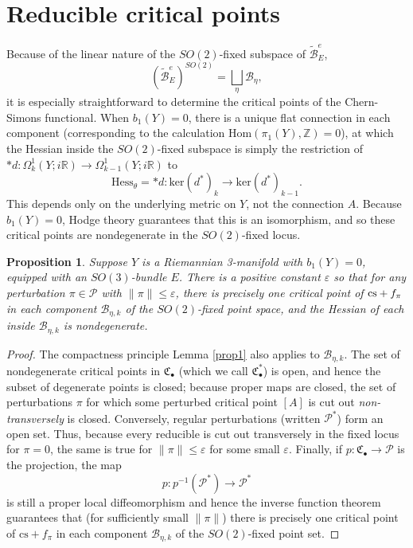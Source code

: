 \documentclass{memo-l}
\newtheorem{proposition}[theorem]{Proposition}
\theoremstyle{definition}
\theoremstyle{remark}
\numberwithin{section}{chapter}
\numberwithin{equation}{chapter}
\begin{document}
\section{Reducible critical points}\label{sec:3d-red}
Because of the linear nature of the $SO(2)$-fixed subspace of $\widetilde{\mathcal B}^e_E$, $$\left(\widetilde{\mathcal B}^e_E\right)^{SO(2)} = \bigsqcup_\eta \mathcal B_{\eta},$$ it is especially straightforward to determine the critical points of the Chern-Simons functional. When $b_1(Y) = 0$, there is a unique flat connection in each component (corresponding to the calculation $\text{Hom}(\pi_1(Y), \mathbb Z) = 0$), at which the Hessian inside the $SO(2)$-fixed subspace is simply the restriction of $*d: \Omega^1_k(Y;i\mathbb R) \to \Omega^1_{k-1}(Y;i\mathbb R)$ to $$\text{Hess}_\theta = *d: \text{ker}(d^*)_k \to \text{ker}(d^*)_{k-1}.$$ This depends only on the underlying metric on $Y$, not the connection $A$. Because $b_1(Y) = 0$, Hodge theory guarantees that this is an isomorphism, and so these critical points are nondegenerate in the $SO(2)$-fixed locus. 

\begin{proposition}\label{red1}Suppose $Y$ is a Riemannian 3-manifold with $b_1(Y) = 0$, equipped with an $SO(3)$-bundle $E$. There is a positive constant $\varepsilon$ so that for any perturbation $\pi \in \mathcal P$ with $\|\pi\| \leq \varepsilon$, there is precisely one critical point of $\textup{cs}+f_\pi$ in each component $\mathcal B_{\eta,k}$ of the $SO(2)$-fixed point space, and the Hessian of each inside $\mathcal B_{\eta, k}$ is nondegenerate. 
\end{proposition}

\begin{proof}The compactness principle Lemma \ref{prop1} also applies to $\mathcal B_{\eta, k}$. The set of nondegenerate critical points in $\mathfrak C_\bullet$ (which we call $\mathfrak C_\bullet^*$) is open, and hence the subset of degenerate points is closed; because proper maps are closed, the set of perturbations $\pi$ for which some perturbed critical point $[A]$ is cut out \textit{non-transversely} is closed. Conversely, regular perturbations (written $\mathcal P^*$) form an open set. Thus, because every reducible is cut out transversely in the fixed locus for $\pi = 0$, the same is true for $\|\pi\| \leq \varepsilon$ for some small $\varepsilon$. Finally, if $p: \mathfrak C_\bullet \to \mathcal P$ is the projection, the map 
$$p: p^{-1}(\mathcal P^*) \to \mathcal P^*$$
is still a proper local diffeomorphism and hence the inverse function theorem guarantees that (for sufficiently small $\|\pi\|$) there is precisely one critical point of $\text{cs}+f_\pi$ in each component $\mathcal B_{\eta, k}$ of the $SO(2)$-fixed point set.
\end{proof}
\end{document}
